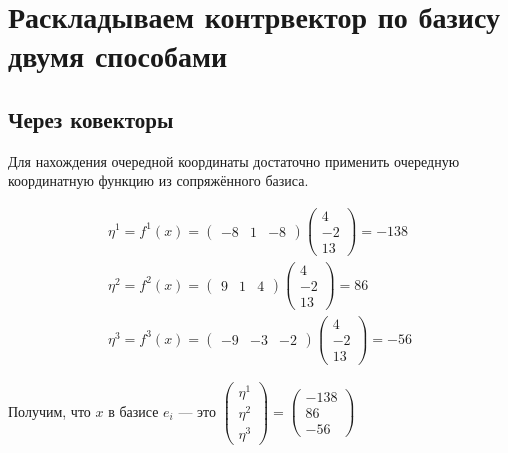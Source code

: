 \documentclass[12pt, a4paper]{article}
\begin{document}
\section{Раскладываем \textbf{контр}вектор по базису двумя способами}

    \subsection{Через ковекторы}

    Для нахождения очередной координаты достаточно применить очередную координатную функцию из сопряжённого базиса.

    \begin{gather}
        \eta^1 = f^1(x) = \begin{pmatrix}
            -8 & 1 & -8
        \end{pmatrix} \begin{pmatrix}
            4 \\ -2 \\ 13
        \end{pmatrix} = -138 \\
        \eta^2 = f^2(x) = \begin{pmatrix}
            9 & 1 & 4
        \end{pmatrix} \begin{pmatrix}
            4 \\ -2 \\ 13
        \end{pmatrix} = 86 \\
        \eta^3 = f^3(x) = \begin{pmatrix}
            -9 & -3 & -2
        \end{pmatrix} \begin{pmatrix}
            4 \\ -2 \\ 13
        \end{pmatrix} = -56
    \end{gather}

    Получим, что $x$ в базисе $e_i$ — это $\begin{pmatrix} \eta^1 \\ \eta^2 \\ \eta^3 \end{pmatrix} = \begin{pmatrix} -138 \\ 86 \\ -56 \end{pmatrix}$
\end{document}

